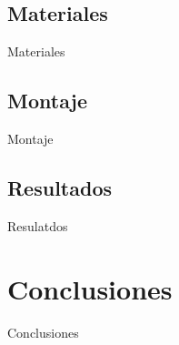 \documentclass{if-beamer}
\begin{document}
\subsection{Materiales}
\begin{frame}{Materiales}
\end{frame}{}

\subsection{Montaje}
\begin{frame}{Montaje}
\end{frame}{}

\subsection{Resultados}
\begin{frame}{Resulatdos}
\end{frame}{}

\section{Conclusiones}
\begin{frame}{Conclusiones}
\end{frame}{}
\end{document}
